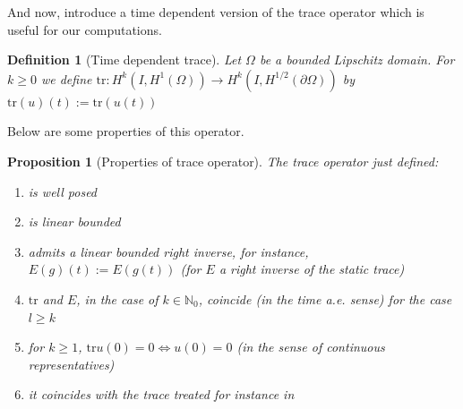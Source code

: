 \documentclass[english,a4paper,10pt,oneside]{scrbook}	%
\theoremstyle{break}
\newtheorem{defn}[equation]{Definition}
\newtheorem{prop}[equation]{Proposition}
\theoremstyle{remark}
\newcommand{\tr}{\text{tr}}
\begin{document}
And now, introduce a time dependent version of the trace operator which is useful for our computations.

\begin{defn}[Time dependent trace]
Let $\Omega$ be a bounded Lipschitz domain. For $k\geq 0$ we define $\tr: H^k(I,H^1(\Omega))\rightarrow H^k(I, H^{1/2} (\partial \Omega))$ by $\tr(u)(t):=\tr(u(t))$
\end{defn}

Below are some properties of this operator.

\begin{prop}[Properties of trace operator]
\label{prop:trace}
The trace operator just defined:
\begin{enumerate}
\item is well posed
\item is linear bounded
\item admits a linear bounded right inverse, for instance, $E(g)(t):=E(g(t))$ (for $E$ a right inverse of the static trace)
\item $\tr$ and $E$, in the case of $k \in \mathbb{N}_0$, coincide (in the time a.e. sense) for the case $l\geq k$
\item for $k\geq 1$, $\tr u(0)=0 \iff u(0)=0$ (in the sense of continuous representatives)
\item it coincides with the trace treated for instance in \cite{lions}
\end{enumerate}
\end{prop}
\end{document}

